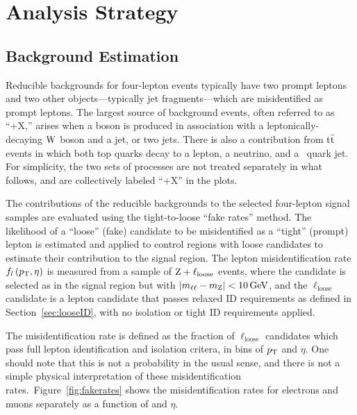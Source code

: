 
\chapter{Analysis Strategy}

\section{Background Estimation}
Reducible backgrounds for four-lepton events typically have two prompt leptons and two other objects---typically jet fragments---which are misidentified as prompt leptons.
The largest source of background events, often referred to as ``\PZ+X,'' arises when a {\PZ} boson is produced in association with a leptonically-decaying $\mathrm{W}$ boson and a jet, or two jets.
There is also a contribution from $\mathrm{t}\bar{\mathrm{t}}$ events in which both top quarks decay to a lepton, a neutrino, and a {\Pqb}~quark jet.
For simplicity, the two sets of processes are not treated separately in what follows, and are collectively labeled ``\PZ+X'' in the plots.

The contributions of the reducible backgrounds to the selected four-lepton signal samples are evaluated using the tight-to-loose ``fake rates'' method.
The likelihood of a ``loose'' (fake) candidate to be misidentified as a  ``tight'' (prompt) lepton is estimated and applied to control regions with loose candidates to estimate their contribution to the signal region.
The lepton misidentification rate $f_l\left(p_\mathrm{T}, \eta\right)$ is measured from a sample of $\mathrm{Z} + \ell_\text{loose}$ events, where the {\PZ} candidate is selected as in the signal region but with $\left| m_{\ell\ell} - m_\mathrm{Z} \right| < 10\,\mathrm{Ge\hspace{-.08em}V}$, and the $\ell_\text{loose}$ candidate is a lepton candidate that passes relaxed ID requirements as defined in Section~\ref{sec:looseID}, with no isolation or tight ID requirements applied.

The misidentification rate is defined as the fraction of $\ell_\text{loose}$ candidates which pass full lepton identification and isolation critera, in bins of $p_\mathrm{T}$ and $\eta$.
One should note that this is not a probability in the usual sense, and there is not a simple physical interpretation of these misidentification rates.\
Figure~\ref{fig:fakerates} shows the misidentification rates for electrons and muons separately as a function of {\pt} and $\eta$.

